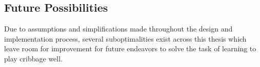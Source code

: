 
\subsection{Future Possibilities}
\label{sec:disc-future}

Due to assumptions and simplifications
made throughout the design and implementation process,
several suboptimalities exist across this thesis
which leave room for improvement for future endeavors to solve the task
of learning to play cribbage well.






